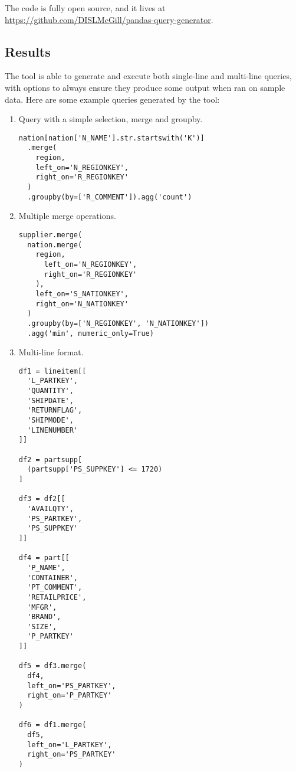 \documentclass[10pt, twocolumn]{article}
\begin{document}
\spacing
\noindent
The code is fully open source, and it lives at \href{https://github.com/DISLMcGill/pandas-query-generator}{https://github.com/DISLMcGill/pandas-query-generator}.

\subsection*{Results}

The tool is able to generate and execute both single-line and multi-line queries, with options to always ensure they produce some output when ran on sample data. Here are some example queries generated by the tool:

\begin{enumerate}

\item Query with a simple selection, merge and groupby.

\begin{verbatim}
nation[nation['N_NAME'].str.startswith('K')]
  .merge(
    region,
    left_on='N_REGIONKEY',
    right_on='R_REGIONKEY'
  )
  .groupby(by=['R_COMMENT']).agg('count')
\end{verbatim}

\item Multiple merge operations.

\begin{verbatim}
supplier.merge(
  nation.merge(
    region,
      left_on='N_REGIONKEY',
      right_on='R_REGIONKEY'
    ),
    left_on='S_NATIONKEY',
    right_on='N_NATIONKEY'
  )
  .groupby(by=['N_REGIONKEY', 'N_NATIONKEY'])
  .agg('min', numeric_only=True)
\end{verbatim}

\item Multi-line format.

\begin{verbatim}
df1 = lineitem[[
  'L_PARTKEY',
  'QUANTITY',
  'SHIPDATE',
  'RETURNFLAG',
  'SHIPMODE',
  'LINENUMBER'
]]

df2 = partsupp[
  (partsupp['PS_SUPPKEY'] <= 1720)
]

df3 = df2[[
  'AVAILQTY',
  'PS_PARTKEY',
  'PS_SUPPKEY'
]]

df4 = part[[
  'P_NAME',
  'CONTAINER',
  'PT_COMMENT',
  'RETAILPRICE',
  'MFGR',
  'BRAND',
  'SIZE',
  'P_PARTKEY'
]]

df5 = df3.merge(
  df4,
  left_on='PS_PARTKEY',
  right_on='P_PARTKEY'
)

df6 = df1.merge(
  df5,
  left_on='L_PARTKEY',
  right_on='PS_PARTKEY'
)
\end{verbatim}

\end{enumerate}
\end{document}
